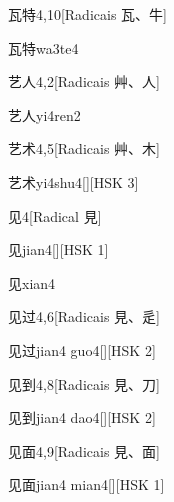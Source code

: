 \begin{entry}{瓦特}{4,10}[Radicais ⽡、⽜]
  \begin{phonetics}{瓦特}{wa3te4}
  \end{phonetics}
\end{entry}

\begin{entry}{艺人}{4,2}[Radicais ⾋、⼈]
  \begin{phonetics}{艺人}{yi4ren2}
  \end{phonetics}
\end{entry}

\begin{entry}{艺术}{4,5}[Radicais ⾋、⽊]
  \begin{phonetics}{艺术}{yi4shu4}[][HSK 3]
  \end{phonetics}
\end{entry}

\begin{entry}{见}{4}[Radical ⾒]
  \begin{phonetics}{见}{jian4}[][HSK 1]
  \end{phonetics}
  \begin{phonetics}{见}{xian4}
  \end{phonetics}
\end{entry}

\begin{entry}{见过}{4,6}[Radicais ⾒、⾡]
  \begin{phonetics}{见过}{jian4 guo4}[][HSK 2]
  \end{phonetics}
\end{entry}

\begin{entry}{见到}{4,8}[Radicais ⾒、⼑]
  \begin{phonetics}{见到}{jian4 dao4}[][HSK 2]
  \end{phonetics}
\end{entry}

\begin{entry}{见面}{4,9}[Radicais ⾒、⾯]
  \begin{phonetics}{见面}{jian4 mian4}[][HSK 1]
  \end{phonetics}
\end{entry}

